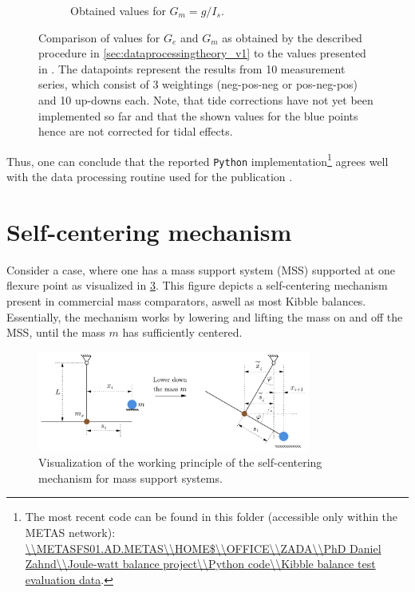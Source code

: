 \documentclass{report}
\numberwithin{tm}{section}
\begin{document}
\begin{figure}[h]
\begin{subfigure}{0.49\textwidth}
		\caption{Obtained values for $G_m =g/I_s$.}
		\label{fig:example_g_i}
	\end{subfigure}
	\caption{Comparison of values for $G_e$ and $G_m$ as obtained by the described procedure in \cref{sec:dataprocessingtheory_v1} to the values presented in \cite{Eichenberger_2022}. The datapoints represent the results from 10 measurement series, which consist of 3 weightings (neg-pos-neg or pos-neg-pos) and 10 up-downs each. Note, that tide corrections have not yet been implemented so far and that the shown values for the blue points hence are not corrected for tidal effects.}
\end{figure}
Thus, one can conclude that the reported \verb|Python| implementation\footnote{The most recent code can be found in this folder (accessible only within the METAS network): \url{\\METASFS01.AD.METAS\\HOME$\\OFFICE\\ZADA\\PhD Daniel Zahnd\\Joule-watt balance project\\Python code\\Kibble balance test evaluation data}.} agrees well with the data processing routine used for the publication \cite{Eichenberger_2022}.

\FloatBarrier

\section{Self-centering mechanism}
Consider a case, where one has a mass support system (MSS) supported at one flexure point as visualized in \cref{fig:selfcentering}. This figure depicts a self-centering mechanism present in commercial mass comparators, aswell as most Kibble balances. Essentially, the mechanism works by lowering and lifting the mass on and off the MSS, until the mass $m$ has sufficiently centered.
\begin{figure}[h]
	\centering
	 \includegraphics[width=0.8\textwidth]{figures/selfcentering.pdf}
	 \caption{Visualization of the working principle of the self-centering mechanism for mass support systems.}
	 \label{fig:selfcentering}
\end{figure}
\end{document}
